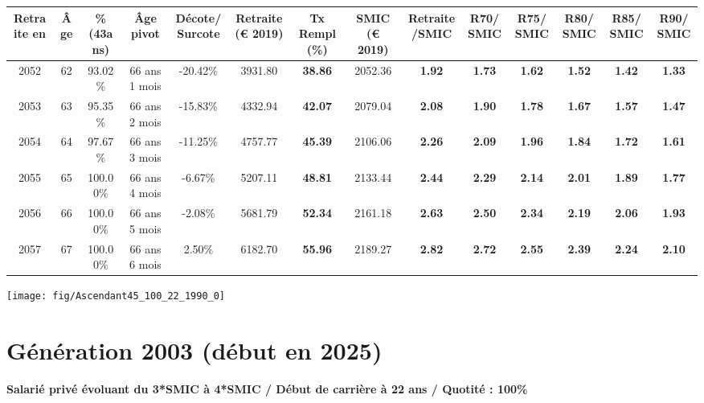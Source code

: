 \begin{adjustbox}{max width=\textwidth} 
\begin{tabular}[htb]{|c|c||c|c|c||c|c||c|c||c|c|c|c|c|} 
\hline 
 Retraite en &  Âge &  \%(43ans) &  Âge pivot &  Décote/Surcote &  Retraite (\euro{} 2019) &  Tx Rempl(\%) &  SMIC (\euro{} 2019) &  Retraite/SMIC &  R70/SMIC &  R75/SMIC &  R80/SMIC &  R85/SMIC &  R90/SMIC \\ 
\hline \hline 
 2052 &  62 &  93.02\% &  66 ans 1 mois &  -20.42\% &  3931.80 &  {\bf 38.86} &  2052.36 &  {\bf 1.92} &  {\bf 1.73} &  {\bf 1.62} &  {\bf 1.52} &  {\bf 1.42} &  {\bf 1.33} \\ 
\hline 
 2053 &  63 &  95.35\% &  66 ans 2 mois &  -15.83\% &  4332.94 &  {\bf 42.07} &  2079.04 &  {\bf 2.08} &  {\bf 1.90} &  {\bf 1.78} &  {\bf 1.67} &  {\bf 1.57} &  {\bf 1.47} \\ 
\hline 
 2054 &  64 &  97.67\% &  66 ans 3 mois &  -11.25\% &  4757.77 &  {\bf 45.39} &  2106.06 &  {\bf 2.26} &  {\bf 2.09} &  {\bf 1.96} &  {\bf 1.84} &  {\bf 1.72} &  {\bf 1.61} \\ 
\hline 
 2055 &  65 &  100.00\% &  66 ans 4 mois &  -6.67\% &  5207.11 &  {\bf 48.81} &  2133.44 &  {\bf 2.44} &  {\bf 2.29} &  {\bf 2.14} &  {\bf 2.01} &  {\bf 1.89} &  {\bf 1.77} \\ 
\hline 
 2056 &  66 &  100.00\% &  66 ans 5 mois &  -2.08\% &  5681.79 &  {\bf 52.34} &  2161.18 &  {\bf 2.63} &  {\bf 2.50} &  {\bf 2.34} &  {\bf 2.19} &  {\bf 2.06} &  {\bf 1.93} \\ 
\hline 
 2057 &  67 &  100.00\% &  66 ans 6 mois &  2.50\% &  6182.70 &  {\bf 55.96} &  2189.27 &  {\bf 2.82} &  {\bf 2.72} &  {\bf 2.55} &  {\bf 2.39} &  {\bf 2.24} &  {\bf 2.10} \\ 
\hline 
\hline 
\end{tabular} 
\end{adjustbox} 
 
 \vspace{0.1cm} 

 {\hspace{-2.2cm}\texttt{[image: fig/Ascendant45\_100\_22\_1990\_0]}} 

\newpage 
 
\section{Génération 2003 (début en 2025)\label{Ascendant45_100_22_2003_0}} 
 
{\bf \noindent Salarié privé évoluant du 3*SMIC à 4*SMIC / Début de carrière à 22 ans / Quotité : 100\%}  ~ 


